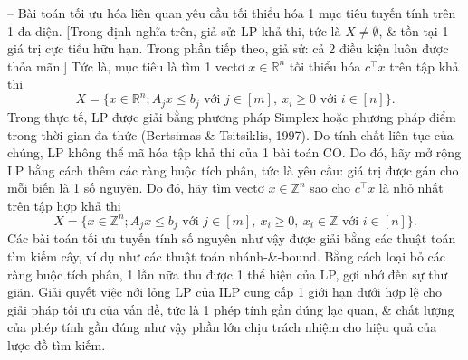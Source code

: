 \documentclass{article}
\begin{document}
\begin{itemize}
\begin{itemize}
\begin{itemize}
            -- Bài toán tối ưu hóa liên quan yêu cầu tối thiểu hóa 1 mục tiêu tuyến tính trên 1 đa diện. [Trong định nghĩa trên, giả sử: LP khả thi, tức là $X\ne\emptyset$, \& tồn tại 1 giá trị cực tiểu hữu hạn. Trong phần tiếp theo, giả sử: cả 2 điều kiện luôn được thỏa mãn.] Tức là, mục tiêu là tìm 1 vectơ $x\in\mathbb{R}^n$ tối thiểu hóa $c^\top x$ trên tập khả thi
            \begin{equation*}
                X = \{x\in\mathbb{R}^n;A_jx\le b_j\mbox{ với } j\in[m],\ x_i\ge0\mbox{ với } i\in[n]\}.
            \end{equation*}
            Trong thực tế, LP được giải bằng phương pháp Simplex hoặc phương pháp điểm trong thời gian đa thức (Bertsimas \& Tsitsiklis, 1997). Do tính chất liên tục của chúng, LP không thể mã hóa tập khả thi của 1 bài toán CO. Do đó, hãy mở rộng LP bằng cách thêm các ràng buộc tích phân, tức là yêu cầu: giá trị được gán cho mỗi biến là 1 số nguyên. Do đó, hãy tìm vectơ $x\in\mathbb{Z}^n$ sao cho $c^\top x$ là nhỏ nhất trên tập hợp khả thi
            \begin{equation*}
                X = \{x\in\mathbb{Z}^n;A_jx\le b_j\mbox{ với } j\in[m],\ x_i\ge0,\ x_i\in\mathbb{Z}\mbox{ với } i\in[n]\}.
            \end{equation*}
            Các bài toán tối ưu tuyến tính số nguyên như vậy được giải bằng các thuật toán tìm kiếm cây, ví dụ như các thuật toán nhánh-\&-bound. Bằng cách loại bỏ các ràng buộc tích phân, 1 lần nữa thu được 1 thể hiện của LP, gợi nhớ đến sự thư giãn. Giải quyết việc nới lỏng LP của ILP cung cấp 1 giới hạn dưới hợp lệ cho giải pháp tối ưu của vấn đề, tức là 1 phép tính gần đúng lạc quan, \& chất lượng của phép tính gần đúng như vậy phần lớn chịu trách nhiệm cho hiệu quả của lược đồ tìm kiếm.


\end{itemize}
\end{itemize}
\end{itemize}
\end{document}

